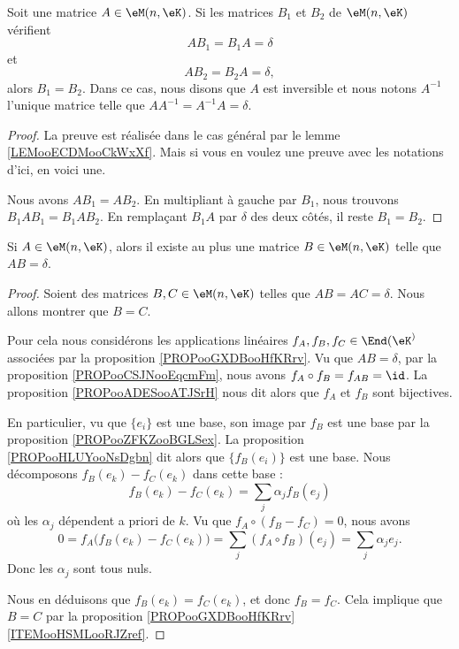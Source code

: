 \begin{propositionDef}      \label{PROPooMLWRooRWfZXE}
    Soit une matrice \( A\in \eM(n,\eK)\). Si les matrices \( B_1\) et \( B_2\) de \( \eM(n,\eK)\) vérifient
    \begin{equation}
        AB_1=B_1A=\delta
    \end{equation}
    et
    \begin{equation}
        AB_2=B_2A=\delta,
    \end{equation}
    alors \( B_1=B_2\). Dans ce cas, nous disons que \( A\) est inversible et nous notons \( A^{-1}\) l'unique matrice telle que \( AA^{-1}=A^{-1}A=\delta\).
\end{propositionDef}

\begin{proof}
    La preuve est réalisée dans le cas général par le lemme \ref{LEMooECDMooCkWxXf}. Mais si vous en voulez une preuve avec les notations d'ici, en voici une.

    Nous avons $AB_1=AB_2$. En multipliant à gauche par \( B_1\), nous trouvons \( B_1AB_1=B_1AB_2\). En remplaçant \( B_1A\) par \( \delta\) des deux côtés, il reste \( B_1=B_2\).
\end{proof}

\begin{lemma}        \label{LEMooGZCTooQigDvC}
    Si \( A\in \eM(n,\eK)\), alors il existe au plus une matrice \( B\in \eM(n,\eK)\) telle que \( AB=\delta\).
\end{lemma}

\begin{proof}
    Soient des matrices \( B,C\in \eM(n,\eK)\) telles que \( AB=AC=\delta\). Nous allons montrer que \( B=C\).

    Pour cela nous considérons les applications linéaires \( f_A, f_B, f_C\in \End(\eK^)\) associées par la proposition \ref{PROPooGXDBooHfKRrv}. Vu que \( AB=\delta\), par la proposition \ref{PROPooCSJNooEqcmFm}, nous avons \( f_A\circ f_B = f_{AB}=\id\). La proposition \ref{PROPooADESooATJSrH} nous dit alors que \( f_A\) et \( f_B\) sont bijectives. 

    En particulier, vu que \( \{e_i\}\) est une base, son image par \( f_B\) est une base par la proposition \ref{PROPooZFKZooBGLSex}. La proposition \ref{PROPooHLUYooNsDgbn} dit alors que \( \{f_B(e_i)\}\) est une base. Nous décomposons \( f_B(e_k)-f_C(e_k)\) dans cette base :
    \begin{equation}
        f_B(e_k)-f_C(e_k)=\sum_j\alpha_jf_B(e_j)
    \end{equation}
    où les \( \alpha_j\) dépendent a priori de \( k\). Vu que \( f_A\circ(f_B-f_C)=0\), nous avons 
    \begin{equation}
        0=f_A\big( f_B(e_k)-f_C(e_k) \big)=\sum_j(f_A\circ f_B)(e_j)=\sum_j\alpha_je_j.
    \end{equation}
    Donc les \( \alpha_j\) sont tous nuls.

    Nous en déduisons que \( f_B(e_k)=f_C(e_k)\), et donc \( f_B=f_C\). Cela implique que \( B=C\) par la proposition \ref{PROPooGXDBooHfKRrv}\ref{ITEMooHSMLooRJZref}.
\end{proof}


